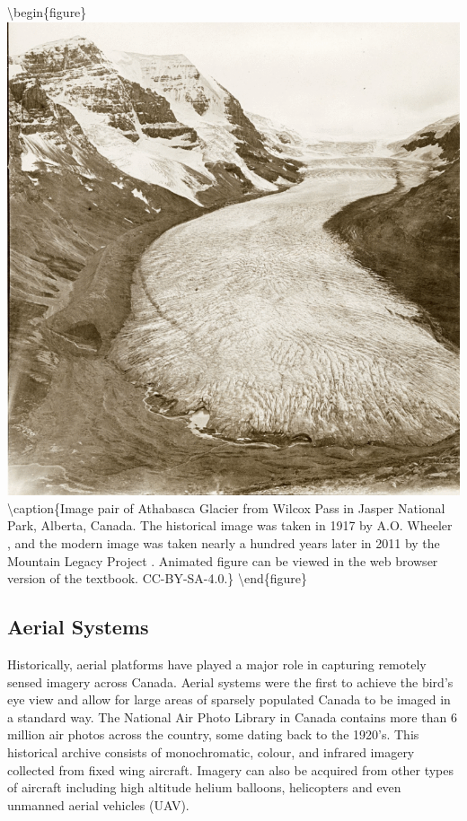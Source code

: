 \documentclass[
]{book}
\begin{document}
\textbackslash begin\{figure\}
\includegraphics[width=0.9\linewidth]{images/12-mountain-legacy-project} \textbackslash caption\{Image pair of Athabasca Glacier from Wilcox Pass in Jasper National Park, Alberta, Canada. The historical image was taken in 1917 by A.O. Wheeler \citep{library_and_archives_canada_athabasca_1917}, and the modern image was taken nearly a hundred years later in 2011 by the Mountain Legacy Project \citep{mountain_legacy_project_modern_2011}. Animated figure can be viewed in the web browser version of the textbook. CC-BY-SA-4.0.\}\label{fig:12-mountain-legacy-project}
\textbackslash end\{figure\}

\subsection{Aerial Systems}\label{aerial-systems}

Historically, aerial platforms have played a major role in capturing remotely sensed imagery across Canada. Aerial systems were the first to achieve the bird's eye view and allow for large areas of sparsely populated Canada to be imaged in a standard way. The National Air Photo Library in Canada contains more than 6 million air photos across the country, some dating back to the 1920's. This historical archive consists of monochromatic, colour, and infrared imagery collected from fixed wing aircraft. Imagery can also be acquired from other types of aircraft including high altitude helium balloons, helicopters and even unmanned aerial vehicles (UAV).
\end{document}
